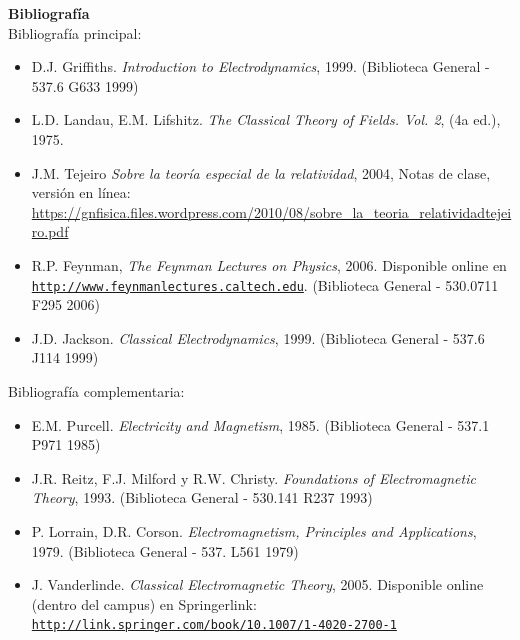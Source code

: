 \documentclass[letterpaper,10pt,onecolumn]{article}
\begin{document}
\noindent\textbf{\large {} \quad
  Bibliograf\'ia}\\[-0.2cm] 


\noindent\normalsize Bibliograf\'ia principal:

\begin{itemize}
	\item D.J. Griffiths. \textit{Introduction to
          Electrodynamics}, 1999. (Biblioteca General - 537.6 G633
          1999) 
        \item L.D. Landau, E.M. Lifshitz. \textit{The Classical
          Theory of Fields. Vol. 2}, (4a ed.), 1975.
        \item J.M. Tejeiro \textit{Sobre la teor\'ia especial de la
          relatividad}, 2004, Notas de clase, versi\'on en l\'inea:
          \url{https://gnfisica.files.wordpress.com/2010/08/sobre_la_teoria_relatividadtejeiro.pdf} 
	\item R.P. Feynman, \textit{The Feynman Lectures on Physics},
          2006. Disponible online en
          \href{http://www.feynmanlectures.caltech.edu}{\nolinkurl{http://www.feynmanlectures.caltech.edu}}. (Biblioteca
          General - 530.0711 F295 2006)\\[-0.6cm] 
	\item J.D. Jackson. \textit{Classical Electrodynamics},
          1999. (Biblioteca General - 537.6 J114 1999)\\[-0.6cm] 
\end{itemize}

\noindent\normalsize Bibliograf\'ia complementaria:

\begin{itemize}
	\item E.M. Purcell. \textit{Electricity and Magnetism},
          1985. (Biblioteca General - 537.1 P971 1985)\\[-0.6cm] 
	\item J.R. Reitz, F.J. Milford y
          R.W. Christy. \textit{Foundations of Electromagnetic
            Theory}, 1993. (Biblioteca General - 530.141 R237
          1993)\\[-0.6cm] 
	\item P. Lorrain, D.R. Corson. \textit{Electromagnetism,
          Principles and Applications}, 1979. (Biblioteca General -
          537. L561 1979)\\[-0.6cm] 
	\item J. Vanderlinde. \textit{Classical Electromagnetic Theory}, 2005. Disponible online (dentro del campus) en Springerlink:\\
	\href{http://link.springer.com/book/10.1007/1-4020-2700-1}{\nolinkurl{http://link.springer.com/book/10.1007/1-4020-2700-1}} 
\end{itemize}
\end{document}
